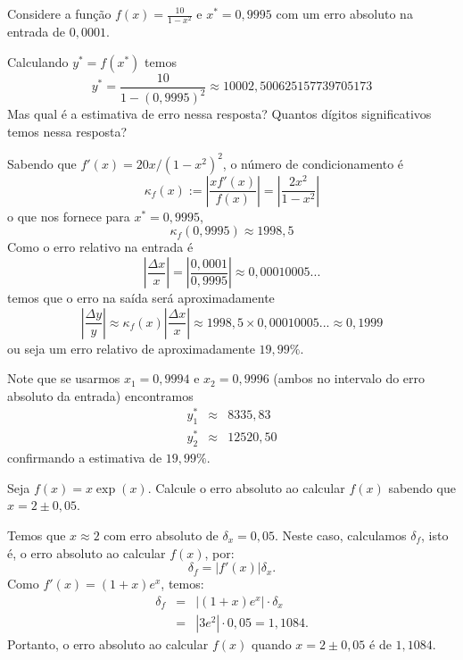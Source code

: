 \begin{ex}
 Considere a função $f(x) = \frac{10}{1-x^2}$ e $x^*=0,9995$ com um erro absoluto na entrada de $0,0001$.

 Calculando $y^*=f(x^*)$ temos
\begin{equation}
   y^* = \frac{10}{1-(0,9995)^2} \approx 10002,500625157739705173
\end{equation}
 Mas qual é a estimativa de erro nessa resposta? Quantos dígitos significativos temos nessa resposta?

Sabendo que $f'(x)=20x/(1-x^2)^2$, o número de condicionamento é
\begin{equation}
   \kappa_f(x) := \left| \frac{ x f'(x)}{f(x)} \right| = \left| \frac{ 2x^2}{1-x^2} \right|
\end{equation}
o que nos fornece para $x^*=0,9995$,
\begin{equation}
   \kappa_f(0,9995) \approx 1998,5
\end{equation}
Como o erro relativo na entrada é
\begin{equation}
   \left|\frac{\Delta x}{x}\right| = \left|\frac{0,0001}{0,9995}\right| \approx  0,00010005...
\end{equation}
temos que o erro na saída será aproximadamente
\begin{equation}
   \left|\frac{\Delta y}{y}\right| \approx \kappa_f(x) \left|\frac{\Delta x}{x}\right| \approx  1998,5 \times 0,00010005... \approx 0,1999
\end{equation}
ou seja um erro relativo de aproximadamente $19,99 \%$.

Note que se usarmos $x_1 = 0,9994$ e $x_2 = 0,9996$ (ambos no intervalo do erro absoluto da entrada) encontramos
\begin{eqnarray}
   y_1^*  &\approx&  8335,83 \\
   y_2^*  &\approx& 12520,50
\end{eqnarray}
confirmando a estimativa de $19,99 \%$.
\end{ex}



\begin{ex}
  Seja $f(x) = x\exp(x)$. Calcule o erro absoluto ao calcular $f(x)$ sabendo que $x = 2 \pm 0,05$.
\end{ex}
\begin{sol}
  Temos que $x\approx 2$ com erro absoluto de $\delta_x = 0,05$. Neste caso, calculamos $\delta_f$, isto é, o erro absoluto ao calcular $f(x)$, por:
  \begin{equation}
    \delta_f = |f'(x)|\delta_x.
  \end{equation}
Como $f'(x) = (1 + x)e^{x}$, temos:
\begin{eqnarray}
  \delta_f &=& |(1 + x)e^{x}|\cdot\delta_x\\
  &=& |3e^2|\cdot 0,05 = 1,1084.
\end{eqnarray}
Portanto, o erro absoluto ao calcular $f(x)$ quando $x=2\pm 0,05$ é de $1,1084$.
\end{sol}

